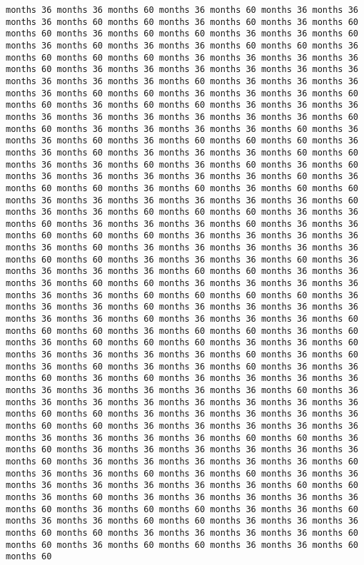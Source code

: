 \documentclass[11pt]{article}
\begin{document}
\begin{Verbatim}[commandchars=\\\{\}, frame=single, framerule=2mm, rulecolor=\color{outerrorbackground}]
months 36 months 36 months 60 months 36 months 60 months 36 months 36 months 36 months 60 months 60 months 36 months 60 months 36 months 60 months 60 months 36 months 60 months 60 months 36 months 36 months 60 months 36 months 60 months 36 months 36 months 60 months 60 months 36 months 60 months 60 months 60 months 36 months 36 months 36 months 36 months 60 months 36 months 36 months 36 months 36 months 36 months 36 months 36 months 36 months 36 months 60 months 36 months 36 months 36 months 36 months 60 months 60 months 36 months 36 months 36 months 60 months 60 months 36 months 60 months 60 months 36 months 36 months 36 months 36 months 36 months 36 months 36 months 36 months 36 months 60 months 60 months 36 months 36 months 36 months 36 months 60 months 36 months 36 months 60 months 36 months 60 months 60 months 60 months 36 months 36 months 60 months 36 months 36 months 36 months 60 months 60 months 36 months 36 months 60 months 36 months 60 months 36 months 60 months 36 months 36 months 36 months 36 months 36 months 60 months 36 months 60 months 60 months 36 months 60 months 36 months 60 months 60 months 36 months 36 months 36 months 36 months 36 months 36 months 60 months 36 months 36 months 60 months 60 months 60 months 36 months 36 months 60 months 36 months 36 months 36 months 60 months 36 months 36 months 60 months 60 months 60 months 36 months 36 months 36 months 36 months 36 months 60 months 36 months 36 months 36 months 36 months 36 months 60 months 60 months 36 months 36 months 36 months 60 months 36 months 36 months 36 months 36 months 60 months 60 months 36 months 36 months 36 months 60 months 60 months 36 months 36 months 36 months 36 months 36 months 36 months 60 months 60 months 60 months 60 months 36 months 36 months 36 months 60 months 36 months 36 months 36 months 36 months 36 months 36 months 60 months 36 months 36 months 36 months 60 months 60 months 60 months 36 months 60 months 60 months 36 months 60 months 36 months 60 months 60 months 60 months 36 months 36 months 60 months 36 months 36 months 36 months 36 months 60 months 36 months 60 months 36 months 60 months 36 months 36 months 60 months 36 months 36 months 60 months 36 months 60 months 36 months 36 months 36 months 36 months 36 months 36 months 36 months 36 months 36 months 60 months 36 months 36 months 36 months 36 months 36 months 36 months 36 months 36 months 60 months 60 months 36 months 36 months 36 months 36 months 36 months 60 months 60 months 36 months 36 months 36 months 36 months 36 months 36 months 36 months 36 months 36 months 60 months 60 months 36 months 60 months 36 months 36 months 36 months 36 months 36 months 36 months 60 months 36 months 36 months 36 months 36 months 36 months 60 months 36 months 36 months 60 months 36 months 60 months 36 months 36 months 36 months 36 months 36 months 36 months 36 months 60 months 60 months 36 months 60 months 36 months 36 months 36 months 36 months 36 months 60 months 36 months 60 months 60 months 36 months 36 months 60 months 36 months 36 months 60 months 60 months 36 months 36 months 36 months 60 months 60 months 36 months 36 months 36 months 36 months 60 months 60 months 36 months 60 months 60 months 36 months 36 months 60 months 60 
\end{Verbatim}
\end{document}
